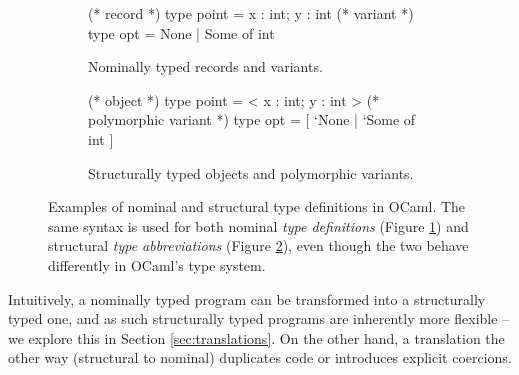 \begin{figure}
    \centering
    \begin{subfigure}{.49\textwidth}
    \centering
    \begin{ocaml}
(* record *)
type point = { x : int; y : int }
(* variant *)
type opt = None | Some of int
    \end{ocaml}
    \caption{Nominally typed records and variants.}
    \label{subfig:nominal-ocaml}
    \end{subfigure}
    \hfill
    \begin{subfigure}{.49\textwidth}
    \centering
    \begin{ocaml}
(* object *)
type point = < x : int; y : int >
(* polymorphic variant *)
type opt = [ `None | `Some of int ]
    \end{ocaml}
    \caption{Structurally typed objects and polymorphic variants.}
    \label{subfig:structural-ocaml}
    \end{subfigure}
    \caption{Examples of nominal and structural type definitions in OCaml. The same syntax is used for both nominal \emph{type definitions} (Figure \ref{subfig:nominal-ocaml}) and structural \emph{type abbreviations} (Figure \ref{subfig:structural-ocaml}), even though the two behave differently in OCaml's type system.}
    \label{fig:nominal-and-structural-ocaml}
\end{figure}

Intuitively, a nominally typed program can be transformed into a structurally typed one, and as such structurally typed programs are inherently more flexible -- we explore this in Section \ref{sec:translations}. On the other hand, a translation the other way (structural to nominal) duplicates code or introduces explicit coercions.

